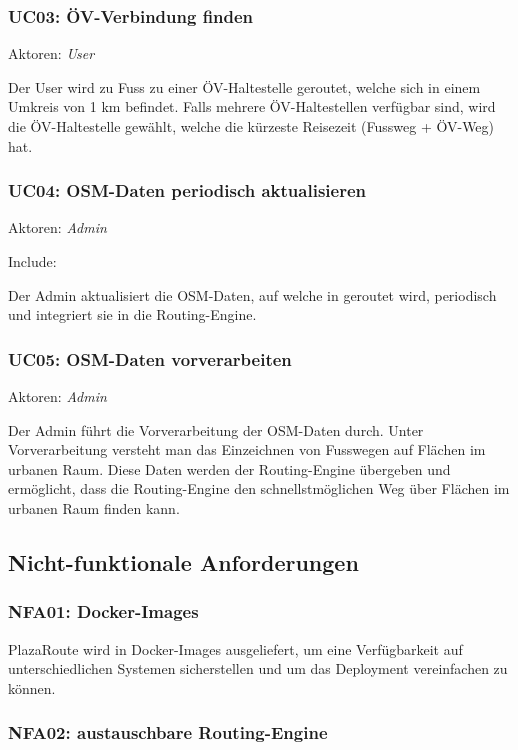 \subsubsection{UC03: ÖV-Verbindung finden}
\label{usecase:UC03}
Aktoren: \emph{User}

Der User wird zu Fuss zu einer ÖV-Haltestelle geroutet, welche sich in einem Umkreis von 1 km befindet. Falls mehrere ÖV-Haltestellen verfügbar sind, wird die ÖV-Haltestelle gewählt, welche die kürzeste Reisezeit (Fussweg + ÖV-Weg) hat.

\subsubsection{UC04: OSM-Daten periodisch aktualisieren}
\label{usecase:UC04}
Aktoren: \emph{Admin}

Include: 

Der Admin aktualisiert die \ac{OSM}-Daten, auf welche in  geroutet wird, periodisch und integriert sie in die \gls{Routing-Engine}.

\subsubsection{UC05: OSM-Daten vorverarbeiten}
\label{usecase:UC05}
Aktoren: \emph{Admin}

Der Admin führt die Vorverarbeitung der \ac{OSM}-Daten durch. Unter Vorverarbeitung versteht man das Einzeichnen von Fusswegen auf Flächen im urbanen Raum. Diese Daten werden der \gls{Routing-Engine} übergeben und ermöglicht, dass die Routing-Engine den schnellstmöglichen Weg über Flächen im urbanen Raum finden kann.

\subsection{Nicht-funktionale Anforderungen}
\label{sub:Nicht-funktionale Anforderungen}

\subsubsection{NFA01: Docker-Images}
\label{NFA:NFA01}

PlazaRoute wird in Docker-Images ausgeliefert, um eine Verfügbarkeit auf unterschiedlichen Systemen sicherstellen und um das Deployment vereinfachen zu können.

\subsubsection{NFA02: austauschbare \gls{Routing-Engine}}
\label{NFA:NFA02}


